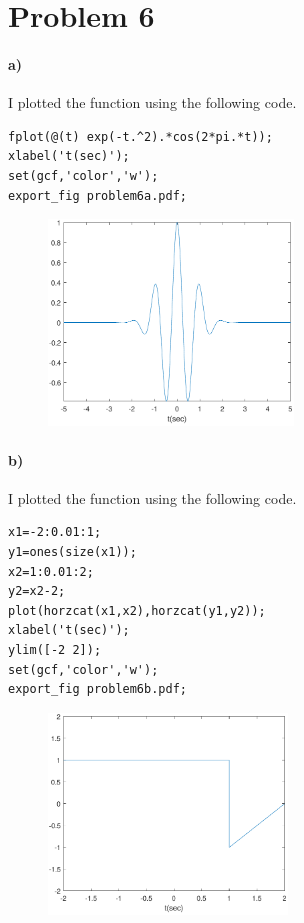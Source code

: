 \documentclass[12pt]{article}
\begin{document}
\section*{Problem 6}

\paragraph{a)}

I plotted the function using the following code.
\begin{verbatim}
fplot(@(t) exp(-t.^2).*cos(2*pi.*t));
xlabel('t(sec)');
set(gcf,'color','w');
export_fig problem6a.pdf;
\end{verbatim}
\begin{figure}[H]
    \begin{center}
        \includegraphics[width=2.56in]{problem6a.pdf}
    \end{center}
\end{figure}

\paragraph{b)}

I plotted the function using the following code.
\begin{verbatim}
x1=-2:0.01:1;
y1=ones(size(x1));
x2=1:0.01:2;
y2=x2-2;
plot(horzcat(x1,x2),horzcat(y1,y2));
xlabel('t(sec)');
ylim([-2 2]);
set(gcf,'color','w');
export_fig problem6b.pdf;
\end{verbatim}
\begin{figure}[H]
    \begin{center}
        \includegraphics[width=2.5in]{problem6b.pdf}
    \end{center}
\end{figure}
\end{document}

